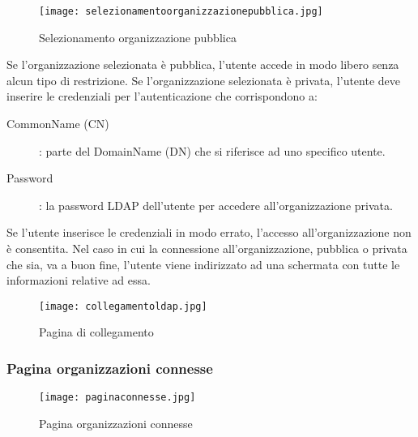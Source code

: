 \documentclass[../manuale-utente.tex]{subfiles}
\begin{document}
 \begin{figure}[H]
   \centering
   \texttt{[image: selezionamentoorganizzazionepubblica.jpg]}
   \caption{Selezionamento organizzazione pubblica}%
   \label{fig:mobile_app_selezionamento_organizzazione_pubblica}
 \end{figure}
Se l'organizzazione selezionata è pubblica, l'utente accede in modo libero senza alcun tipo di restrizione.
Se l'organizzazione selezionata è privata, l'utente deve inserire le credenziali per l'autenticazione  che corrispondono a:
\begin{description}
  \item[CommonName (CN)]: parte del DomainName (DN) che si riferisce ad uno specifico utente.
  \item[Password]: la password LDAP dell'utente per accedere all'organizzazione privata.
\end{description}
Se l'utente inserisce le credenziali in modo errato, l'accesso all'organizzazione non è consentita.
Nel caso in cui la connessione all'organizzazione, pubblica o privata che sia, va a buon fine, l'utente viene indirizzato ad una schermata con tutte le informazioni relative ad essa.


\begin{figure}[H]
  \centering
  \texttt{[image: collegamentoldap.jpg]}
  \caption{Pagina di collegamento}%
  \label{fig:mobile_app_pagina_collegamento_ldap}
\end{figure}


\subsubsection{Pagina organizzazioni connesse}%
\label{subs:pagina_organizzazioni_connesse}

 \begin{figure}[H]
   \centering
   \texttt{[image: paginaconnesse.jpg]}
   \caption{Pagina organizzazioni connesse}%
   \label{fig:mobile_app_pagina_organizzazioni_connesse}
 \end{figure}
\end{document}
